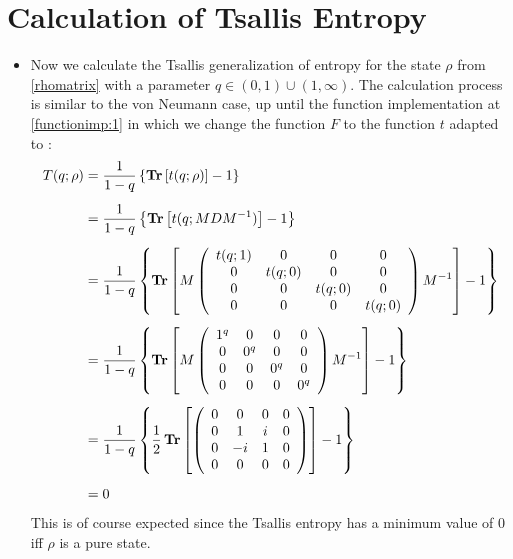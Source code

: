 \section{Calculation of Tsallis Entropy}
\begin{itemize}
\item
Now we calculate the Tsallis generalization of entropy for the state $\rho$ from \eqref{rhomatrix} with a parameter $q \in(0,1) \cup(1, \infty) $. The calculation process is similar to the von Neumann case, up until the function implementation at \eqref{functionimp:1} in which we change the function $F$ to the function  $t$ adapted to :
\begin{align}
\label{functionimp1}
T(q;\rho) &= \frac{1}{1-q} \left\{ \operatorname{\textup{\textbf{Tr}}} \left[ t(q;\rho) \right] -1   \right\} \\[0.5em]
&= \frac{1}{1-q} \left\{ \operatorname{\textup{\textbf{Tr}}} \left[ t(q;MDM^{-1}) \right] -1   \right\} \\[0.5em]
&=\frac{1}{1-q} \left\{ \operatorname{\textup{\textbf{Tr}}} \left[
M
\left( \begin{array}{cccc}
 t(q;1) & 0 & 0 & 0 \\
 0 & t(q;0) & 0 & 0 \\
 0 & 0 & t(q;0) & 0 \\
 0 & 0 & 0 & t(q;0) \\
\end{array}
\right)
M^{-1}
\right]-1
\right\}
\nonumber\\[0.5em]
&=\frac{1}{1-q} \left\{ \operatorname{\textup{\textbf{Tr}}} \left[
M
\left( \begin{array}{cccc}
 1^{q} & 0 & 0 & 0 \\
 0 & 0^{q} & 0 & 0 \\
 0 & 0 & 0^{q} & 0 \\
 0 & 0 & 0 & 0^{q} \\
\end{array}
\right)
M^{-1}
\right]-1
\right\}
\nonumber\\[0.5em]
&=\frac{1}{1-q} \left\{ \frac{1}{2} \operatorname{\textup{\textbf{Tr}}} \left[ \left(
\begin{array}{cccc}
 0 & 0 & 0 & 0 \\
 0 & 1 & i & 0 \\
 0 & -i & 1 & 0 \\
 0 & 0 & 0 & 0 \\
\end{array}
\right) \right] -1
\right\} \\[0.5em]
&=0
\end{align}
This is of course expected since the  Tsallis entropy has a minimum value of $0$ iff $\rho$ is a pure state. 

\end{itemize}
